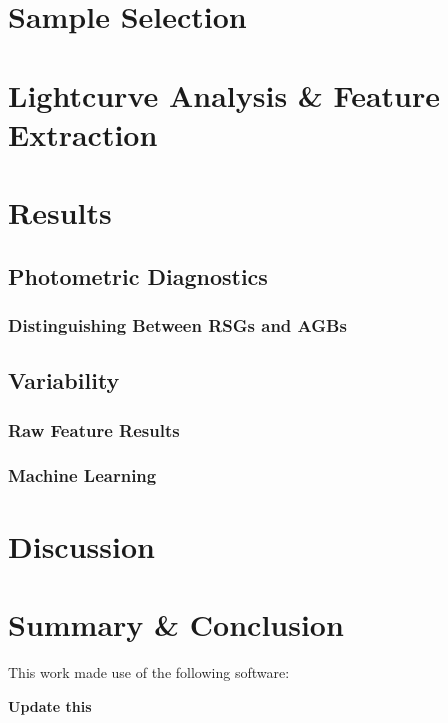 \documentclass[twocolumn]{aastex62}
\begin{document}
\section{Sample Selection}\label{sec:sample}

\section{Lightcurve Analysis \& Feature Extraction}\label{sec:lightcurves}

\section{Results}\label{sec:results}

\subsection{Photometric Diagnostics}\label{subsec:photometry}

\subsubsection{Distinguishing Between RSGs and AGBs}

\subsection{Variability}\label{subsec:variability}

\subsubsection{Raw Feature Results}

\subsubsection{Machine Learning}

\section{Discussion}\label{sec:discussion}

\section{Summary \& Conclusion}\label{sec:conclusion}



\acknowledgments


This work made use of the following software:

\vspace{5mm}

{\bf Update this}




\end{document}

